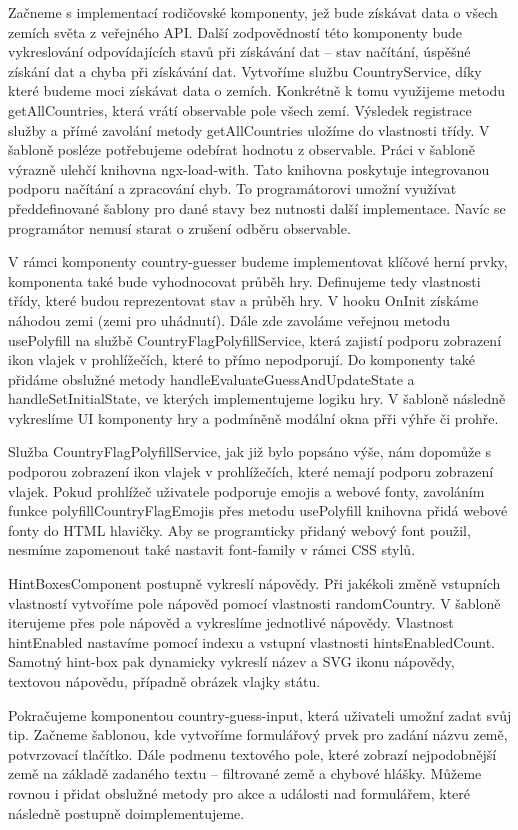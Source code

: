 Začneme s implementací rodičovské komponenty, jež bude získávat data o všech zemích světa z veřejného API. 
Další zodpovědností této komponenty bude vykreslování odpovídajících stavů při získávání dat -- stav načítání, úspěšné získání dat a chyba při získávání dat. 
Vytvoříme službu CountryService, díky které budeme moci získávat data o zemích. Konkrétně k tomu využijeme metodu getAllCountries, která vrátí observable pole všech zemí. 
Výsledek registrace služby a přímé zavolání metody getAllCountries uložíme do vlastnosti třídy. V šabloně posléze potřebujeme odebírat hodnotu z observable. 
Práci v šabloně výrazně ulehčí knihovna ngx-load-with. Tato knihovna poskytuje integrovanou podporu načítání a zpracování chyb. 
To programátorovi umožní využívat předdefinované šablony pro dané stavy bez nutnosti další implementace. Navíc se programátor nemusí starat o zrušení odběru observable.

V rámci komponenty country-guesser budeme implementovat klíčové herní prvky, komponenta také bude vyhodnocovat průběh hry. 
Definujeme tedy vlastnosti třídy, které budou reprezentovat stav a průběh hry. V hooku OnInit získáme náhodou zemi (zemi pro uhádnutí). 
Dále zde zavoláme veřejnou metodu usePolyfill na službě CountryFlagPolyfillService, která zajistí podporu zobrazení ikon vlajek v prohlížečích, které to přímo nepodporují.
Do komponenty také přidáme obslužné metody handleEvaluateGuessAndUpdateState a handleSetInitialState, ve kterých implementujeme logiku hry. 
V šabloně následně vykreslíme UI komponenty hry a podmíněně modální okna přři výhře či prohře.

Služba CountryFlagPolyfillService, jak již bylo popsáno výše, nám dopomůže s podporou zobrazení ikon vlajek v prohlížečích, které nemají podporu zobrazení vlajek. 
Pokud prohlížeč uživatele podporuje emojis a webové fonty, zavoláním funkce polyfillCountryFlagEmojis přes metodu usePolyfill knihovna přidá webové fonty do HTML hlavičky.
Aby se programticky přidaný webový font použil, nesmíme zapomenout také nastavit font-family v rámci CSS stylů. 

HintBoxesComponent postupně vykreslí nápovědy. Při jakékoli změně vstupních vlastností vytvoříme pole nápověd pomocí vlastnosti randomCountry. 
V šabloně iterujeme přes pole nápověd a vykreslíme jednotlivé nápovědy. Vlastnost hintEnabled nastavíme pomocí indexu a vstupní vlastnosti hintsEnabledCount. 
Samotný hint-box pak dynamicky vykreslí název a SVG ikonu nápovědy, textovou nápovědu, případně obrázek vlajky státu.

Pokračujeme komponentou country-guess-input, která uživateli umožní zadat svůj tip. 
Začneme šablonou, kde vytvoříme formulářový prvek pro zadání názvu země, potvrzovací tlačítko. 
Dále podmenu textového pole, které zobrazí nejpodobnější země na základě zadaného textu -- filtrované země a chybové hlášky. 
Můžeme rovnou i přidat obslužné metody pro akce a události nad formulářem, které následně postupně doimplementujeme.

